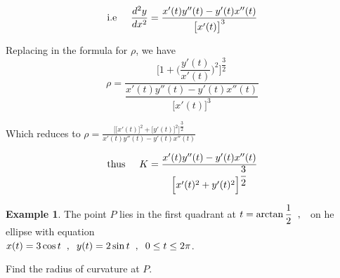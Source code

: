 \documentclass[11pt,a4paper]{article}
\theoremstyle{definition}
\newtheorem{exa}[thm]{Example}
\begin{document}
$$\text{i.e}\hspace{0.5cm} \frac{d^2y}{dx^2} = \frac{x'(t)y''(t) - y'(t)x''(t)}{\big[x'(t)\big]^3}$$

Replacing in the formula for $\rho$, we have
$$\rho = \frac{\Bigg[ 1 + \Bigg(\dfrac{y'(t)}{x'(t)}\Bigg)^2\Bigg]^{\dfrac{3}{2}}}{\dfrac{x'(t)y''(t) - y'(t)x''(t)}{\big[x'(t)\big]^3}}$$


Which reduces to
\hspace{0.3cm}$\displaystyle{\rho = \frac{\Big[\big[x'(t)\big]^2 + \big[y'(t)\big]^2\Big]^{\dfrac{3}{2}}}{x'(t)y''(t) - y'(t)x''(t)}}$


$$\text{thus}\hspace{0.5cm} K = \frac{x'(t)y''(t) - y'(t)x''(t)}{\Big[x'(t)^2 + y'(t)^2\Big]^{\dfrac{3}{2}}}$$


\begin{exa}


The point $P$ lies in the first quadrant at $t = \arctan \dfrac{1}{2}\hspace{0.2cm}, \hspace{0.2cm} $ on he ellipse with equation\\ $x(t) = 3\cos t\hspace{0.2cm} , \hspace{0.2cm} y(t) = 2\sin t\hspace{0.2cm} , \hspace{0.2cm} 0 \leq t \leq 2\pi$.


Find the radius of curvature at $P$.
\end{exa}
\end{document}
